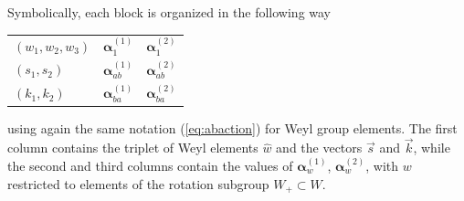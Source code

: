 \documentclass[10pt,a4paper]{amsart}
\def\bal{\boldsymbol{\alpha}}
\theoremstyle{definition}
\numberwithin{equation}{section}
\begin{document}
Symbolically, each block is organized in the following way

\begin{table}[h!]\centering \renewcommand{\arraystretch}{1.2}
\centering
\begin{tabular}{|lll|}
\hline
$\left(w_1,w_2,w_3\right)$ & $\bal^{(1)}_{1}$ & $\bal^{(2)}_{1}$\\
$\left(s_1,s_2\right)$ & $\bal^{(1)}_{ab}$ & $\bal^{(2)}_{ab}$\\
$\left(k_1,k_2\right)$ & $\bal^{(1)}_{ba}$ & $\bal^{(2)}_{ba}$\\\hline
\end{tabular}
\end{table}
\noindent using again the same notation (\ref{eq:abaction}) for Weyl group elements.
The first column contains the
triplet of Weyl elements $\hat{w}$ and the vectors $\vec{s}$ and
$\vec{k}$, while the second and third columns contain the values of
$\bal^{(1)}_{w}$, $\bal^{(2)}_{w}$, with $w$ restricted to elements of the rotation subgroup $W_+\subset W$.
\end{document}
